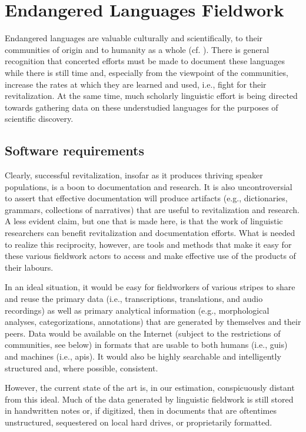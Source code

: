 \documentclass[11pt]{article}
\begin{document}
\section{Endangered Languages Fieldwork}\label{sec:fieldwork}

Endangered languages are valuable culturally and scientifically, to their
communities of origin and to humanity as a whole (cf.
\cite{harrison2007languages}). There is general recognition that concerted
efforts must be made to document these languages while there is still time and,
especially from the viewpoint of the communities, increase the rates at which
they are learned and used, i.e., fight for their revitalization.  At the same
time, much scholarly linguistic effort is being directed towards gathering data
on these understudied languages for the purposes of scientific discovery.

\subsection{Software requirements}

Clearly, successful revitalization, insofar as it produces thriving speaker
populations, is a boon to documentation and research. It is also
uncontroversial to assert that effective documentation will produce artifacts
(e.g., dictionaries, grammars, collections of narratives) that are useful to
revitalization and research. A less evident claim, but one that is made here,
is that the work of linguistic researchers can benefit revitalization and
documentation efforts. What is needed to realize this reciprocity, however, are
tools and methods that make it easy for these various fieldwork actors to access
and make effective use of the products of their labours.

In an ideal situation, it would be easy for fieldworkers of various stripes to
share and reuse the primary data (i.e., transcriptions, translations, and audio
recordings) as well as primary analytical information (e.g., morphological
analyses, categorizations, annotations) that are generated by themselves and
their peers. Data would be available on the Internet (subject to the
restrictions of communities, see below) in formats that are usable to both
humans (i.e., \glspl{gui}) and machines (i.e., \glspl{api}). It would also be
highly searchable and intelligently structured and, where possible, consistent.

However, the current state of the art is, in our estimation, conspicuously
distant from this ideal. Much of the data generated by linguistic fieldwork is
still stored in handwritten notes or, if digitized, then in documents that are
oftentimes unstructured, sequestered on local hard drives, or proprietarily
formatted.
\end{document}
